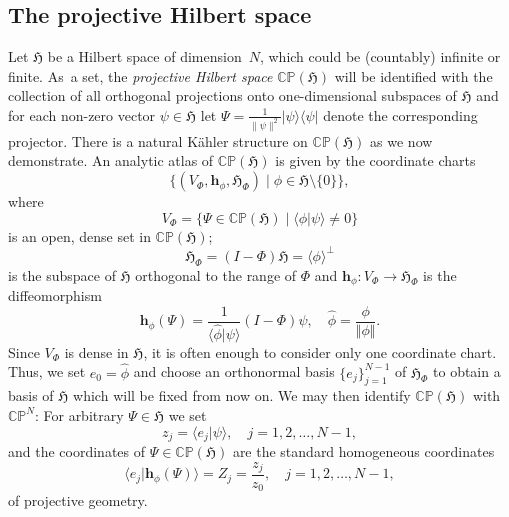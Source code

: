 \documentclass[12pt]{amsart}
\numberwithin{equation}{section}
\theoremstyle{remark}
\newcommand\HH{\mathfrak H}
\newcommand{\be}{\begin{equation}}
\newcommand{\en}{\end{equation}}
\newcommand{\s }{\mathbf}
\newcommand{\prhs}{{\mathbb C\mathbb P}( \HH)}
\newcommand{\C}{\mathbb C}
\begin{document}
\subsection{The projective Hilbert space}\label{projhilbsp}
Let $\HH$ be a Hilbert space of dimension~$N$, which could be (countably)
infinite or finite. As~a set, the {\it projective Hilbert space\/} $\prhs$ will
be identified with the collection of all orthogonal projections onto
one-dimensional subspaces of $\HH$ and  for each non-zero vector $\psi \in \HH$
let  $\Psi = \frac{1}{\parallel \psi \parallel^2}\vert \psi\rangle\langle  \psi
\vert$ denote the corresponding projector. There is a natural  K\"ahler
structure on $\prhs$ as we now demonstrate. An analytic atlas of $\prhs$ is
given by the coordinate charts
\be
  \{ (V_{\Phi}, {\s h}_\phi , \HH_\Phi) \mid \phi \in \HH\setminus\{0\}  \},
\en
where
\be
 V_{\Phi} = \{ \Psi \in \prhs \mid \langle\phi \vert  \psi \rangle \not= 0\}
\en
is an open, dense set in $\prhs$;
\be
 {\HH}_\Phi = (I - \Phi){\HH} = \langle\phi\rangle^\perp
\en
is the subspace of $\HH$ orthogonal to the range of $\Phi$ and ${\s h}_\phi :
V_\Phi \to {\HH}_\Phi$ is the diffeomorphism
\begin{equation}
 {\s h}_\phi (\Psi) = \frac{1}{\langle \hat \phi\vert
 \psi\rangle}(I - \Phi)\psi,
  \quad \hat\phi = \frac{\phi}{\Vert\phi\Vert}.
\end{equation}
Since $V_\Phi$ is dense in $\HH$, it is often enough to consider only one
coordinate chart. Thus, we set $e_0 = \hat \phi$ and  choose an orthonormal
basis $\{e_j\}_{j=1}^{N-1}$ of $\HH_\Phi$ to obtain  a basis of $\HH$ which
will be fixed from now on. We may then identify $\prhs$ with
${\C}{\mathbb P}^N$: For arbitrary $\Psi \in \HH$ we set
\begin{equation}\label{coord}
z_j = \langle e_j |\psi \rangle, \quad j = 1,2, \ldots , N-1,
\end{equation}
and the coordinates of $\Psi \in \prhs$ are the standard homogeneous
coordinates
\begin{equation}
 \langle e_j \vert {\s h}_\phi (\Psi)\rangle =  Z_j = \frac{z_j}{z_0},
   \quad j = 1,2, \ldots , N-1,
 \label{homogcoord}
\end{equation}
of projective geometry.
\end{document}
